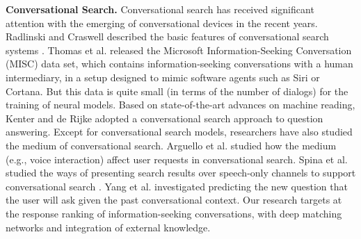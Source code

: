 \textbf{Conversational Search.}
Conversational search has received significant attention with the emerging of conversational devices in the recent years. Radlinski and Craswell described the basic features of conversational search systems \cite{radlinski2017theoretical}. Thomas et al. \cite{thomas2017misc} released the Microsoft Information-Seeking Conversation (MISC) data set, which contains information-seeking conversations with a human intermediary, in a setup designed to mimic software agents such as Siri or Cortana. But this data is quite small (in terms of the number of dialogs) for the training of neural models. Based on state-of-the-art advances on machine reading, Kenter and de Rijke \cite{kenter-attentive-2017} adopted a conversational search approach to question answering. Except for conversational search models, researchers have also studied the medium of conversational search. Arguello et al. \cite{arguello2017factors} studied how the medium (e.g., voice interaction) affect user requests in conversational search. Spina et al. studied the ways of presenting search results over speech-only channels to support conversational search \cite{spina2017extracting,trippas2015towards}. Yang et al. \cite{DBLP:journals/corr/YangZZGC17} investigated predicting the new question that the user will ask given the past conversational context. Our research targets at the response ranking of information-seeking conversations, with deep matching networks and integration of external knowledge.


